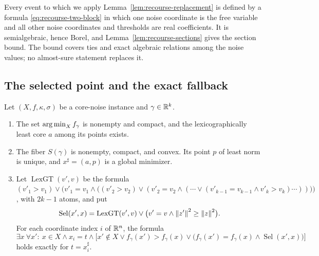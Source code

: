 Every event to which we apply Lemma~\ref{lem:recourse-replacement} is
defined by a formula \eqref{eq:recourse-two-block} in which one noise
coordinate is the free variable and all other noise coordinates and
thresholds are real coefficients. It is semialgebraic, hence Borel, and
Lemma~\ref{lem:recourse-sections} gives the section bound. The bound
covers ties and exact algebraic relations among the noise values; no
almost-sure statement replaces it.

\subsection{The selected point and the exact fallback}
\label{app:recourse-fallback}

\begin{lemma}
\label{lem:recourse-selected-point}
Let $(X,f,\kappa,\sigma)$ be a core-noise instance and $\gamma\in\mathbb R^k$.
\begin{enumerate}[label=(\alph*)]
\item The set $\operatorname*{arg\,min}_Xf_\gamma$ is nonempty and compact, and the
lexicographically least core $a$ among its points exists.
\item The fiber $S(\gamma)$ is nonempty, compact, and convex. Its point
$p$ of least norm is unique, and $x^\sharp=(a,p)$ is a global minimizer.
\item Let
$\operatorname{LexGT}(v',v)$ be the formula
$(v'_1>v_1)\vee\bigl(v'_1=v_1\wedge\bigl((v'_2>v_2)\vee(v'_2=v_2\wedge
(\cdots\vee(v'_{k-1}=v_{k-1}\wedge v'_k>v_k)\cdots))\bigr)\bigr)$, with
$2k-1$ atoms, and put
\[
 \operatorname{Sel}(x',x)=\operatorname{LexGT}(v',v)\vee
 \bigl(v'=v\wedge\left\lVert z'\right\rVert^2\ge\left\lVert z\right\rVert^2\bigr).
\]
For each coordinate index $i$ of $\mathbb R^n$, the formula
\begin{equation}
 \exists x\ \forall x':\ x\in X\wedge x_i=t\wedge
 \bigl[x'\notin X\vee f_\gamma(x')>f_\gamma(x)\vee
 \bigl(f_\gamma(x')=f_\gamma(x)\wedge\operatorname{Sel}(x',x)\bigr)\bigr]
 \label{eq:recourse-singleton}
\end{equation}
holds exactly for $t=x^\sharp_i$.
\end{enumerate}
\end{lemma}

